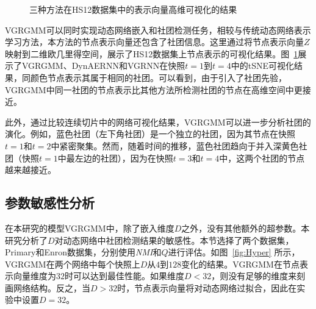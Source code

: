 \begin{figure}[htbp]
    \centering
    \caption{三种方法在HS12数据集中的表示向量高维可视化的结果}
    \label{fig:Visu}
\end{figure}

VGRGMM可以同时实现动态网络嵌入和社团检测任务，相较与传统动态网络表示学习方法，本方法的节点表示向量还包含了社团信息。这里通过将节点表示向量$Z$映射到二维欧几里得空间，展示了HS12数据集上节点表示的可视化结果。图~\ref{fig:Visu}展示了VGRGMM、DynAERNN和VGRNN在快照$t=1$到$t=4$中的tSNE可视化结果，同颜色节点表示其属于相同的社团。可以看到，由于引入了社团先验，VGRGMM中同一社团的节点表示比其他方法所检测社团的节点在高维空间中更接近。

此外，通过比较连续切片中的网络可视化结果，VGRGMM可以进一步分析社团的演化。例如，蓝色社团（左下角社团）是一个独立的社团，因为其节点在快照$t=1$和$t=2$中紧密聚集。然而，随着时间的推移，蓝色社团趋向于并入深黄色社团（快照$t=1$中最左边的社团），因为在快照$t=3$和$t=4$中，这两个社团的节点越来越接近。


\subsection{参数敏感性分析}




在本研究的模型VGRGMM中，除了嵌入维度$D$之外，没有其他额外的超参数。本研究分析了$D$对动态网络中社团检测结果的敏感性。本节选择了两个数据集，Primary和Enron数据集，分别使用\emph{NMI}和$Q$进行评估。如图~\ref{fig:Hyper} 所示，VGRGMM在两个网络中每个快照上$D$从$4$到$128$变化的结果。VGRGMM在节点表示向量维度为$32$时可以达到最佳性能。如果维度$D < 32$，则没有足够的维度来刻画网络结构。反之，当$D > 32$时，节点表示向量将对动态网络过拟合，因此在实验中设置$D = 32$。


